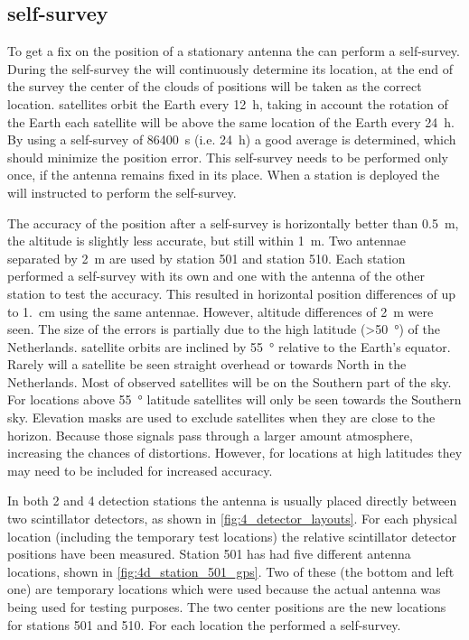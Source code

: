 \subsection{\gps self-survey}

To get a fix on the position of a stationary \gps antenna the \gps can perform a self-survey. During the self-survey the \gps will continuously determine its location, at the end of the survey the center of the clouds of positions will be taken as the correct location. \gps satellites orbit the Earth every \SI{12}{\hour}, taking in account the rotation of the Earth each \gps satellite will be above the same location of the Earth every \SI{24}{\hour}. By using a self-survey of \SI{86400}{\second} (i.e. \SI{24}{\hour}) a good average is determined, which should minimize the position error. This self-survey needs to be performed only once, if the \gps antenna remains fixed in its place. When a \hisparc station is deployed the \gps will instructed to perform the self-survey.

The accuracy of the position after a self-survey is horizontally better than \SI{0.5}{\meter}, the altitude is slightly less accurate, but still within \SI{1}{\meter}. Two \gps antennae separated by \SI{2}{\meter} are used by station 501 and station 510. Each station performed a self-survey with its own \gps and one with the \gps antenna of the other station to test the accuracy. This resulted in horizontal position differences of up to \SI{1.}{\centi\meter} using the same \gps antennae. However, altitude differences of \SI{2}{\meter} were seen. The size of the errors is partially due to the high latitude (\SI{>50}{\degree}) of the Netherlands. \gps satellite orbits are inclined by \SI{55}{\degree} relative to the Earth's equator. Rarely will a satellite be seen straight overhead or towards North in the Netherlands. Most of observed satellites will be on the Southern part of the sky. For locations above \SI{55}{\degree} latitude satellites will only be seen towards the Southern sky. Elevation masks are used to exclude \gps satellites when they are close to the horizon. Because those signals pass through a larger amount atmosphere, increasing the chances of distortions. However, for locations at high latitudes they may need to be included for increased accuracy.

In both 2 and 4 detection stations the \gps antenna is usually placed directly between two scintillator detectors, as shown in \cref{fig:4_detector_layouts}. For each physical \gps location (including the temporary test locations) the relative scintillator detector positions have been measured. Station 501 has had five different \gps antenna locations, shown in \cref{fig:4d_station_501_gps}. Two of these (the bottom and left one) are temporary locations which were used because the actual \gps antenna was being used for testing purposes. The two center positions are the new \gps locations for stations 501 and 510. For each location the \gps performed a self-survey.

